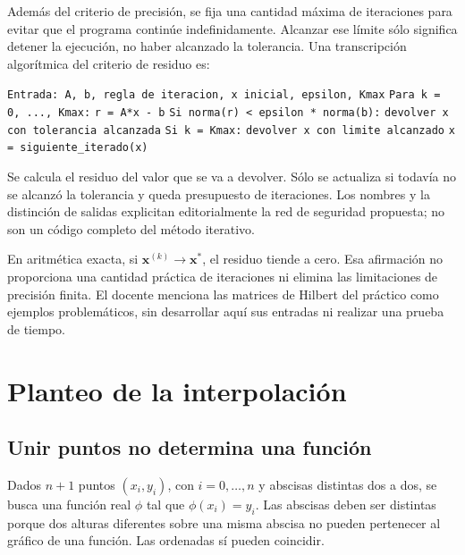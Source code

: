 \documentclass[12pt,a4paper]{article}
\begin{document}
Además del criterio de precisión, se fija una cantidad máxima de iteraciones para evitar que el programa continúe indefinidamente. Alcanzar ese límite sólo significa detener la ejecución, no haber alcanzado la tolerancia. Una transcripción algorítmica del criterio de residuo es:

\begin{algorithm}[H]
\small\DontPrintSemicolon
\hspace*{0.0em}\texttt{Entrada: A, b, regla de iteracion, x inicial, epsilon, Kmax}\;
\hspace*{0.0em}\texttt{Para k = 0, ..., Kmax:}\;
\hspace*{0.7em}\texttt{r = A*x - b}\;
\hspace*{0.7em}\texttt{Si norma(r) < epsilon * norma(b):}\;
\hspace*{1.4em}\texttt{devolver x con tolerancia alcanzada}\;
\hspace*{0.7em}\texttt{Si k = Kmax:}\;
\hspace*{1.4em}\texttt{devolver x con limite alcanzado}\;
\hspace*{0.7em}\texttt{x = siguiente\_iterado(x)}\;
\end{algorithm}

Se calcula el residuo del valor que se va a devolver. Sólo se actualiza si todavía no se alcanzó la tolerancia y queda presupuesto de iteraciones. Los nombres y la distinción de salidas explicitan editorialmente la red de seguridad propuesta; no son un código completo del método iterativo.

En aritmética exacta, si $\mathbf x^{(k)}\to\mathbf x^*$, el residuo tiende a cero. Esa afirmación no proporciona una cantidad práctica de iteraciones ni elimina las limitaciones de precisión finita. El docente menciona las matrices de Hilbert del práctico como ejemplos problemáticos, sin desarrollar aquí sus entradas ni realizar una prueba de tiempo.

\section{Planteo de la interpolación}

\subsection{Unir puntos no determina una función}

Dados $n+1$ puntos $(x_i,y_i)$, con $i=0,\ldots,n$ y abscisas distintas dos a dos, se busca una función real $\phi$ tal que $\phi(x_i)=y_i$. Las abscisas deben ser distintas porque dos alturas diferentes sobre una misma abscisa no pueden pertenecer al gráfico de una función. Las ordenadas sí pueden coincidir.
\end{document}
